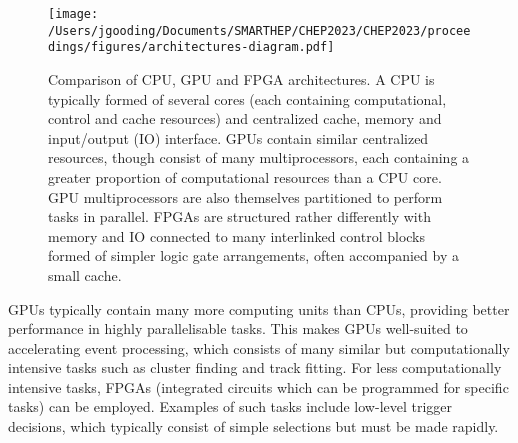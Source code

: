 \begin{figure*}[h!]
    \centering
    \texttt{[image: /Users/jgooding/Documents/SMARTHEP/CHEP2023/CHEP2023/proceedings/figures/architectures-diagram.pdf]}
    \caption{Comparison of CPU, GPU and FPGA architectures. A CPU is typically formed of several cores (each containing computational, control and cache resources) and centralized cache, memory and input/output (IO) interface. GPUs contain similar centralized resources, though consist of many multiprocessors, each containing a greater proportion of computational resources than a CPU core. GPU multiprocessors are also themselves partitioned to perform tasks in parallel. FPGAs are structured rather differently with memory and IO connected to many interlinked control blocks formed of simpler logic gate arrangements, often accompanied by a small cache.}
    \label{architectures}       %
\end{figure*}

GPUs typically contain many more computing units than CPUs, providing better performance in highly parallelisable tasks. This makes GPUs well-suited to accelerating event processing, which consists of many similar but computationally intensive tasks such as cluster finding and track fitting. \cite{vomBruch-gpus} For less computationally intensive tasks, FPGAs (integrated circuits which can be programmed for specific tasks) can be employed. \cite{fpgas-intro} Examples of such tasks include low-level trigger decisions, which typically consist of simple selections but must be made rapidly. \cite{duarte-fpgas}\par